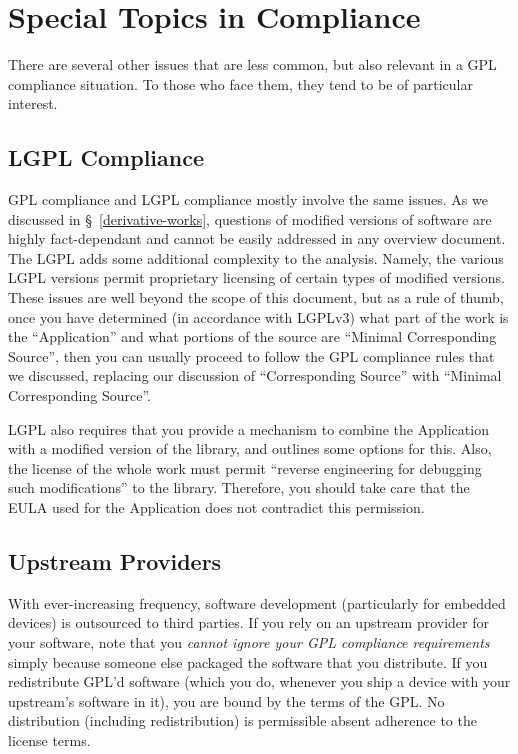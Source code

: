 \chapter{Special Topics in Compliance}

There are several other issues that are less common, but also relevant in
a GPL compliance situation.  To those who face them, they tend to be of
particular interest.

\section{LGPL Compliance}
\label{lgpl}

GPL compliance and LGPL compliance mostly involve the same issues.  As we
discussed in \S~\ref{derivative-works}, questions of modified versions of
software are highly fact-dependant and cannot be easily addressed in any
overview document.  The LGPL adds some additional complexity to the
analysis.  Namely, the various LGPL versions permit proprietary licensing
of certain types of modified versions.  These issues are well beyond the
scope of this document, but as a rule of thumb, once you have determined
(in accordance with LGPLv3) what part of the work is the ``Application''
and what portions of the source are ``Minimal Corresponding Source'', then
you can usually proceed to follow the GPL compliance rules that we
discussed, replacing our discussion of ``Corresponding Source'' with
``Minimal Corresponding Source''.

LGPL also requires that you provide a mechanism to combine the Application
with a modified version of the library, and outlines some options for
this.  Also, the license of the whole work must permit ``reverse
engineering for debugging such modifications'' to the library.  Therefore,
you should take care that the EULA used for the Application does not
contradict this permission.

\section{Upstream Providers}
\label{upstream}

With ever-increasing frequency, software development (particularly for
embedded devices) is outsourced to third parties.  If you rely on an
upstream provider for your software, note that you \emph{cannot ignore
  your GPL compliance requirements} simply because someone else packaged
the software that you distribute.  If you redistribute GPL'd software
(which you do, whenever you ship a device with your upstream's software in
it), you are bound by the terms of the GPL\@.  No distribution (including
redistribution) is permissible absent adherence to the license terms.

